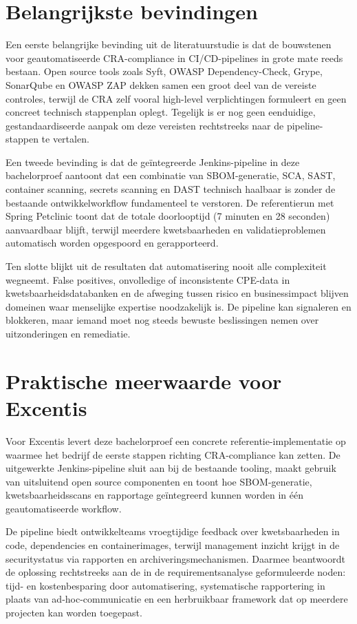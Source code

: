 \section{Belangrijkste bevindingen}

Een eerste belangrijke bevinding uit de literatuurstudie is dat de bouwstenen voor geautomatiseerde CRA-compliance in CI/CD-pipelines in grote mate reeds bestaan. Open source tools zoals Syft, OWASP Dependency-Check, Grype, SonarQube en OWASP ZAP dekken samen een groot deel van de vereiste controles, terwijl de CRA zelf vooral high-level verplichtingen formuleert en geen concreet technisch stappenplan oplegt. Tegelijk is er nog geen eenduidige, gestandaardiseerde aanpak om deze vereisten rechtstreeks naar de pipeline-stappen te vertalen.

Een tweede bevinding is dat de geïntegreerde Jenkins-pipeline in deze bachelorproef aantoont dat een combinatie van SBOM-generatie, SCA, SAST, container scanning, secrets scanning en DAST technisch haalbaar is zonder de bestaande ontwikkelworkflow fundamenteel te verstoren. De referentierun met Spring Petclinic toont dat de totale doorlooptijd (7 minuten en 28 seconden) aanvaardbaar blijft, terwijl meerdere kwetsbaarheden en validatieproblemen automatisch worden opgespoord en gerapporteerd.

Ten slotte blijkt uit de resultaten dat automatisering nooit alle complexiteit wegneemt. False positives, onvolledige of inconsistente CPE-data in kwetsbaarheidsdatabanken en de afweging tussen risico en businessimpact blijven domeinen waar menselijke expertise noodzakelijk is. De pipeline kan signaleren en blokkeren, maar iemand moet nog steeds bewuste beslissingen nemen over uitzonderingen en remediatie.

\section{Praktische meerwaarde voor Excentis}

Voor Excentis levert deze bachelorproef een concrete referentie-implementatie op waarmee het bedrijf de eerste stappen richting CRA-compliance kan zetten. De uitgewerkte Jenkins-pipeline sluit aan bij de bestaande tooling, maakt gebruik van uitsluitend open source componenten en toont hoe SBOM-generatie, kwetsbaarheidsscans en rapportage geïntegreerd kunnen worden in één geautomatiseerde workflow.

De pipeline biedt ontwikkelteams vroegtijdige feedback over kwetsbaarheden in code, dependencies en containerimages, terwijl management inzicht krijgt in de securitystatus via rapporten en archiveringsmechanismen. Daarmee beantwoordt de oplossing rechtstreeks aan de in de requirementsanalyse geformuleerde noden: tijd- en kostenbesparing door automatisering, systematische rapportering in plaats van ad-hoc-communicatie en een herbruikbaar framework dat op meerdere projecten kan worden toegepast.

